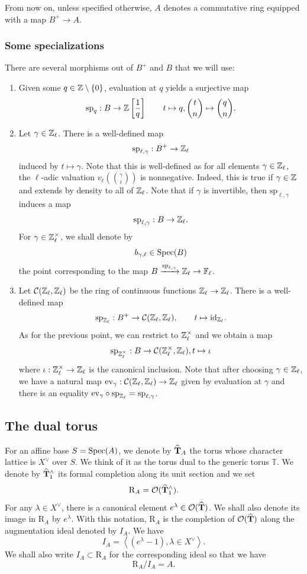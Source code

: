 \documentclass[a4paper, 10pt, oneside, reqno]{amsart}
\theoremstyle{plain}
\theoremstyle{definition}
\theoremstyle{remark}
\newcommand{\RR}{\mathrm{R}}
\newcommand{\Tbb}{\mathbb{T}}
\newcommand{\spe}{\mathrm{sp}}
\begin{document}
From now on, unless specified otherwise, $A$ denotes a commutative ring equipped with a map $B^+\to A$.

\subsubsection{Some specializations}\label{subsubsec:specializations}
There are several morphisms out of $B^+$ and $B$ that we will use: 
\begin{enumerate}
\item Given some $q \in \mathbb{Z}\setminus \{0\}$, evaluation at $q$ yields a surjective map  
$$\spe_{q} : B \to \Z\left[\frac{1}{q}\right] \qquad t \mapsto q, \binom{t}{n} \mapsto \binom{q}{n}.$$ 
\item Let $\gamma \in \mathbb{Z}_{\ell}$. There is a well-defined map 
$$\spe_{\ell,\gamma} : B^+ \to \Zl$$ 
induced by $t \mapsto \gamma$. Note that this is well-defined as for all elements $\gamma \in \mathbb{Z}_{\ell}$, the $\ell$-adic valuation $v_{\ell}(\binom{\gamma}{i})$ is nonnegative. Indeed, this is true if $\gamma \in \mathbb{Z}$ and extends by density to all of $\mathbb{Z}_{\ell}$. 
Note that if $\gamma$ is invertible, then $\spe_{\ell, \gamma}$ induces a map 
$$\spe_{\ell, \gamma} : B \to \Zl.$$
For $\gamma\in\mathbb{Z}_{\ell}^{\times}$, we shall denote by 
\begin{equation}\label{eq:definition-point-bql}
b_{\gamma, \ell} \in \mathrm{Spec}(B)
\end{equation}
the point corresponding to the map $B \xrightarrow{\spe_{\ell, \gamma}} \Zl \to \Fl$.
\item Let $\mathcal{C}(\mathbb{Z}_{\ell}, \mathbb{Z}_{\ell})$ be the ring of continuous functions $\mathbb{Z}_{\ell} \to \mathbb{Z}_{\ell}$. There is a well-defined map 
$$\spe_{\Zl} : B^+ \to \Ccal(\Zl, \Zl), \qquad t \mapsto \id_{\Zl}.$$
As for the previous point, we can restrict to $\mathbb{Z}_{\ell}^{\times}$ and we obtain a map 
$$\spe_{\Zl^{\times}} : B \to \Ccal(\Zl^{\times}, \Zl), t \mapsto \iota$$ 
where $\iota : \mathbb{Z}_{\ell}^{\times} \to \mathbb{Z}_{\ell}$ is the canonical inclusion. Note that after choosing $\gamma \in \mathbb{Z}_{\ell}$, we have a natural map $\mathrm{ev}_{\gamma} : \mathcal{C}(\mathbb{Z}_{\ell}, \mathbb{Z}_{\ell}) \to \mathbb{Z}_{\ell}$ given by evaluation at $\gamma$ and there is an equality $\ev_{\gamma} \circ \spe_{\Zl} = \spe_{\ell, \gamma}$. 

\end{enumerate}

\subsection{The dual torus}
For an affine base $S = \mathrm{Spec}(A)$, we denote by $\widehat{\mathbf{T}}_A$ the torus whose character lattice is $X^{\vee}$ over $S$. We think of it as the torus dual to the generic torus $\Tbb$. We denote by $\widehat{\mathbf{T}}^{\wedge}_1$ its formal completion along its unit section and we set 
$$\RR_A = \Ocal(\widehat{\Tbf}^{\wedge}_1).$$ 
For any $\lambda \in X^{\vee}$, there is a canonical element $e^{\lambda} \in \mathcal{O}(\widehat{\mathbf{T}})$. We shall also denote its image in $\RR_A$ by $e^{\lambda}$. With this notation, $\RR_A$ is the completion of $\mathcal{O}(\widehat{\mathbf{T}})$ along the augmentation ideal denoted by $I_A$. We have 
$$I_A = \left\langle (e^{\lambda} - 1), \lambda \in X^{\vee} \right\rangle.$$
We shall also write $I_A \subset \RR_A$ for the corresponding ideal so that we have 
$$\RR_A/I_A = A.$$ 
\end{document}
